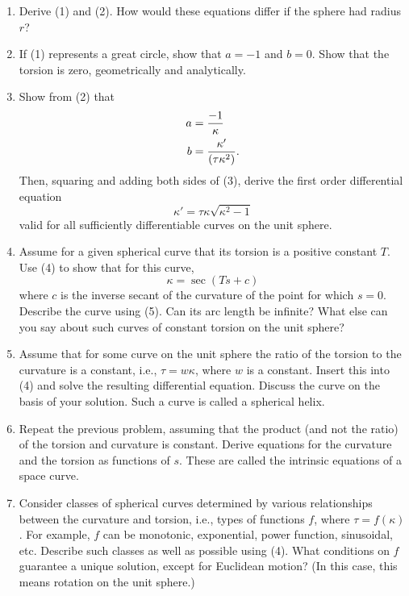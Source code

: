 \documentclass{book}
\begin{document}
\begin{enumerate}[1.]
  \item Derive (1) and (2). How would these equations differ if the sphere had radius $r$?
  \item If (1) represents a great circle, show that $a = -1$ and $b = 0$. Show that the torsion is zero, geometrically and analytically.
  \item Show from (2) that
    \begin{align}
      a & = \frac{-1}{\kappa} \\
      b & = \frac{\kappa'}{(\tau \kappa^{2})}. \notag
    \end{align}
    Then, squaring and adding both sides of (3), derive the first order differential equation
    \begin{equation}
      \kappa ' = \tau \kappa \sqrt{\kappa^{2}-1}
    \end{equation}
    valid for all sufficiently differentiable curves on the unit sphere.
  \item Assume for a given spherical curve that its torsion is a positive constant $T$. Use (4) to show that for this curve,
    \begin{equation}
      \kappa = \sec (Ts + c)
    \end{equation}
    where $c$ is the inverse secant of the curvature of the point for which $s = 0$. Describe the curve using (5). Can its arc length be infinite? What else can you say about such curves of constant torsion on the unit sphere?
  \item Assume that for some curve on the unit sphere the ratio of the torsion to the curvature is a constant, i.e., $\tau = w \kappa$, where $w$ is a constant. Insert this into (4) and solve the resulting differential equation. Discuss the curve on the basis of your solution. Such a curve is called a spherical helix.
  \item Repeat the previous problem, assuming that the product (and not the ratio) of the torsion and curvature is constant. Derive equations for the curvature and the torsion as functions of $s$. These are called the intrinsic equations of a space curve.
  \item Consider classes of spherical curves determined by various relationships between the curvature and torsion, i.e., types of functions $f$, where $\tau = f(\kappa)$. For example, $f$ can be monotonic, exponential, power function, sinusoidal, etc. Describe such classes as well as possible using (4). What conditions on $f$ guarantee a unique solution, except for Euclidean motion? (In this case, this means rotation on the unit sphere.)

\end{enumerate}
\end{document}
